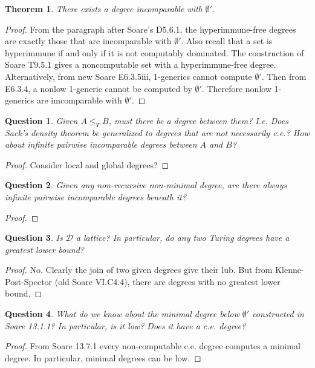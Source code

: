 \documentclass{article}
\newtheorem{theorem}{Theorem}[subsection]
\newtheorem{question}{Question}[subsection]
\begin{document}
    \begin{theorem}
      There exists a degree incomparable with $\emptyset'$.
    \end{theorem}
    \begin{proof}
      From the paragraph after Soare's D5.6.1, the hyperimmune-free degrees
      are exactly those that are incomparable with $\emptyset'$. Also
      recall that a set is hyperimmune if and only if it is not computably
      dominated. The construction of Soare T9.5.1 gives a noncomputable set
      with a hyperimmune-free degree. \\

      Alternatively, from new Soare E6.3.5iii, 1-generics cannot compute
      $\emptyset'$. Then from E6.3.4, a nonlow 1-generic cannot be computed
      by $\emptyset'$. Therefore nonlow 1-generics are imcomparable with
      $\emptyset'$.
    \end{proof}

    \begin{question}
      Given $A\leq_T B$, must there be a degree between them? I.e. Does
      Sack's density theorem be generalized to degrees that are not
      necessarily c.e.? How about infinite pairwise incomparable degrees
      between $A$ and $B$?
    \end{question}
    \begin{proof}
      Consider local and global degrees?
    \end{proof}

    \begin{question}
      Given any non-recursive non-minimal degree, are there always infinite
      pairwise incomparable degrees beneath it?
    \end{question}
    \begin{proof}
    \end{proof}

    \begin{question}
      Is $\mathcal{D}$ a lattice? In particular, do any two Turing degrees
      have a greatest lower bound?
    \end{question}
    \begin{proof}
      No. Clearly the join of two given degrees give their lub. But from
      Klenne-Post-Spector (old Soare VI.C4.4), there are degrees with no
      greatest lower bound.
    \end{proof}

    \begin{question}
      What do we know about the minimal degree below $\emptyset'$
      constructed in Soare 13.1.1? In particular, is it low? Does it have a
      c.e. degree?
    \end{question}
    \begin{proof}
      From Soare 13.7.1 every non-computable c.e. degree computes a minimal
      degree. In particular, minimal degrees can be low.
    \end{proof}
\end{document}
